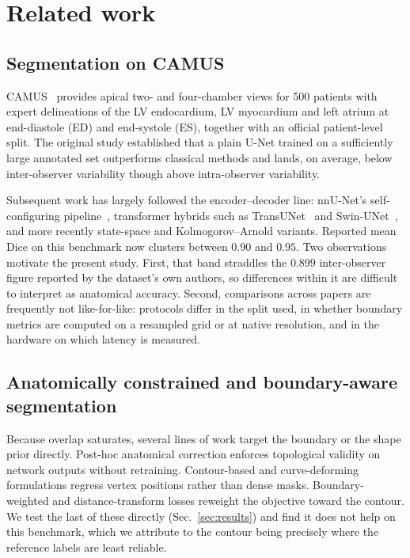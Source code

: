 \section{Related work}
\label{sec:related}

\subsection{Segmentation on CAMUS}

CAMUS~\cite{leclerc2019camus} provides apical two- and four-chamber views for
500 patients with expert delineations of the LV endocardium, LV myocardium and
left atrium at end-diastole (ED) and end-systole (ES), together with an official
patient-level split. The original study established that a plain U-Net trained
on a sufficiently large annotated set outperforms classical methods and lands,
on average, below inter-observer variability though above intra-observer
variability.

Subsequent work has largely followed the encoder--decoder line:
nnU-Net's self-configuring pipeline~\cite{isensee2021nnunet}, transformer
hybrids such as TransUNet~\cite{chen2021transunet} and
Swin-UNet~\cite{cao2022swinunet}, and more recently state-space and
Kolmogorov--Arnold variants. Reported mean Dice on this benchmark now clusters
between $0.90$ and $0.95$. Two observations motivate the present study. First,
that band straddles the $0.899$ inter-observer figure reported by the dataset's
own authors, so differences within it are difficult to interpret as anatomical
accuracy. Second, comparisons across papers are frequently not like-for-like:
protocols differ in the split used, in whether boundary metrics are computed on
a resampled grid or at native resolution, and in the hardware on which latency
is measured.

\subsection{Anatomically constrained and boundary-aware segmentation}

Because overlap saturates, several lines of work target the boundary or the
shape prior directly. Post-hoc anatomical correction enforces topological
validity on network outputs without retraining. Contour-based and
curve-deforming formulations regress vertex positions rather than dense masks.
Boundary-weighted and distance-transform losses reweight the objective toward
the contour. We test the last of these directly (Sec.~\ref{sec:results}) and
find it does not help on this benchmark, which we attribute to the contour being
precisely where the reference labels are least reliable.

